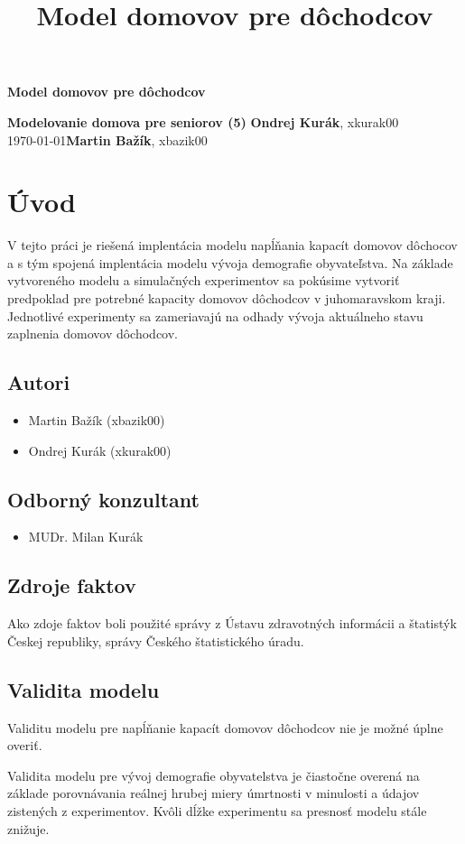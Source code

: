 \documentclass[a4paper, 11pt]{article}
\title{Model domovov pre dôchodcov}
\begin{document}
\begin{center}
\Large \textbf{Model domovov pre dôchodcov}
\end{center}
\noindent
\large\textbf{Modelovanie domova pre seniorov (5)} \hfill \textbf{Ondrej Kurák}, xkurak00 \\
\today \hfill \textbf{Martin Bažík}, xbazik00 \\


\section{Úvod}
V tejto práci je riešená implentácia modelu\cite[str. 7]{IMS} napĺňania kapacít domovov dôchocov a s tým spojená implentácia modelu vývoja demografie obyvateľstva. Na základe vytvoreného modelu a simulačných experimentov\cite[str. 8]{IMS} sa pokúsime vytvoriť predpoklad pre potrebné kapacity domovov dôchodcov v juhomaravskom kraji. Jednotlivé experimenty sa zameriavajú na odhady vývoja aktuálneho stavu zaplnenia domovov dôchodcov.
\subsection{Autori}
\begin{itemize}
\item Martin Bažík (xbazik00)
\item Ondrej Kurák (xkurak00)
\end{itemize}
\subsection{Odborný konzultant}
\begin{itemize}
\item MUDr. Milan Kurák
\end{itemize}
\subsection{Zdroje faktov}
Ako zdoje faktov boli použité správy z Ústavu zdravotných informácii a štatistýk Českej republiky\cite{demografia}\cite{domovy}, správy Českého štatistického úradu\cite{zomreli}. 
\subsection{Validita modelu}
Validitu modelu\cite[str. 37]{IMS} pre napĺňanie kapacít domovov dôchodcov nie je možné úplne overiť.

Validita modelu pre vývoj demografie obyvatelstva je čiastočne overená na základe porovnávania reálnej hrubej miery úmrtnosti v minulosti a údajov zistených z experimentov. Kvôli dĺžke experimentu sa presnosť modelu stále znižuje.
\end{document}
